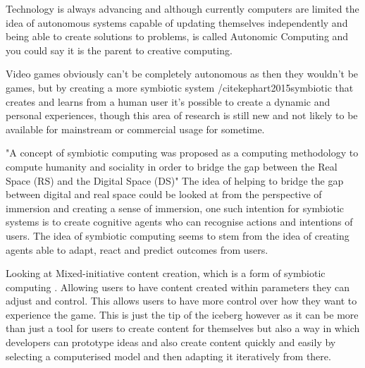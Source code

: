 \documentclass{scrartcl}
\begin{document}
Technology is always advancing and although currently computers are limited the idea of autonomous systems capable of updating themselves independently and being able to create solutions to problems, is called Autonomic Computing \cite{viroli2016combining} \cite{capodieci2013designing} \cite{krupitzer2015towards} and you could say it is the parent to creative computing. 

Video games obviously can't be completely autonomous as then they wouldn't be games, but by creating a more symbiotic system /cite{kephart2015symbiotic} that creates and learns from a human user it's possible to create a dynamic and personal experiences, though this area of research is still new and not likely to be available for mainstream or commercial usage for sometime. 

"A concept of symbiotic computing was proposed as a computing methodology to compute humanity and sociality in order to bridge the gap between the Real Space (RS) and the Digital Space (DS)" \cite{sugawara2008design} The idea of helping to bridge the gap between digital and real space could be looked at from the perspective of immersion and creating a sense of immersion, one such intention for symbiotic systems is to create cognitive agents who can recognise actions and intentions of users. The idea of symbiotic computing seems to stem from the idea of creating agents able to adapt, react and predict outcomes from users. 

Looking at Mixed-initiative content creation, which is a form of symbiotic computing \cite{liapis2016mixed} \cite{yannakakis2014mixed}. Allowing users to have content created within parameters they can adjust and control. This allows users to have more control over how they want to experience the game. This is just the tip of the iceberg however as it can be more than just a tool for users to create content for themselves but also a way in which developers can prototype ideas and also create content quickly and easily by selecting a computerised model and then adapting it iteratively from there.




\end{document}
